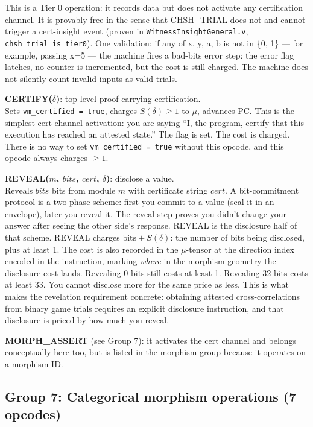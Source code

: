 \documentclass[11pt,a4paper]{article}
\theoremstyle{plain}
\theoremstyle{definition}
\theoremstyle{remark}
\begin{document}
This is a Tier 0 operation: it records data but does not activate any certification channel. It is provably free in the sense that CHSH\_TRIAL does not and cannot trigger a cert-insight event (proven in \texttt{WitnessInsightGeneral.v}, \texttt{chsh\_trial\_is\_tier0}). One validation: if any of x, y, a, b is not in \{0, 1\} --- for example, passing x=5 --- the machine fires a bad-bits error step: the error flag latches, no counter is incremented, but the cost is still charged. The machine does not silently count invalid inputs as valid trials.

\medskip
\noindent\textbf{CERTIFY($\delta$)}: top-level proof-carrying certification.\\
Sets \texttt{vm\_certified = true}, charges $S(\delta) \geq 1$ to $\mu$, advances PC. This is the simplest cert-channel activation: you are saying ``I, the program, certify that this execution has reached an attested state.'' The flag is set. The cost is charged. There is no way to set \texttt{vm\_certified = true} without this opcode, and this opcode always charges $\geq 1$.

\medskip
\noindent\textbf{REVEAL($m$, $\mathit{bits}$, $\mathit{cert}$, $\delta$)}: disclose a value.\\
Reveals $\mathit{bits}$ bits from module $m$ with certificate string $\mathit{cert}$. A bit-commitment protocol is a two-phase scheme: first you commit to a value (seal it in an envelope), later you reveal it. The reveal step proves you didn't change your answer after seeing the other side's response. REVEAL is the disclosure half of that scheme. REVEAL charges $\text{bits} + S(\delta)$: the number of bits being disclosed, plus at least 1. The cost is also recorded in the $\mu$-tensor at the direction index encoded in the instruction, marking \emph{where} in the morphism geometry the disclosure cost lands. Revealing 0 bits still costs at least 1. Revealing 32 bits costs at least 33. You cannot disclose more for the same price as less. This is what makes the revelation requirement concrete: obtaining attested cross-correlations from binary game trials requires an explicit disclosure instruction, and that disclosure is priced by how much you reveal.

\medskip
\noindent\textbf{MORPH\_ASSERT} (see Group 7): it activates the cert channel and belongs conceptually here too, but is listed in the morphism group because it operates on a morphism ID.

\subsection{Group 7: Categorical morphism operations (7 opcodes)}
\end{document}
